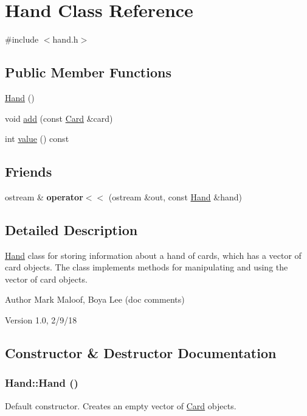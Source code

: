 \hypertarget{classHand}{
\section{Hand Class Reference}
\label{classHand}
}


{\ttfamily \#include $<$hand.h$>$}\subsection*{Public Member Functions}
\begin{DoxyCompactItemize}
\item 
\hyperlink{classHand_aa733faf150351c640fc7d1bf460b07e9}{Hand} ()
\item 
void \hyperlink{classHand_a9c0ca327ec857f46c93c08402d232263}{add} (const \hyperlink{classCard}{Card} \&card)
\item 
int \hyperlink{classHand_ac552f6d63bd6b1bb1d32ebd3d2c25b2e}{value} () const 
\end{DoxyCompactItemize}
\subsection*{Friends}
\begin{DoxyCompactItemize}
\item 
\hypertarget{classHand_a14d9ddfc75ad21d896dcd073479857f6}{
ostream \& {\bfseries operator$<$$<$} (ostream \&out, const \hyperlink{classHand}{Hand} \&hand)}
\label{classHand_a14d9ddfc75ad21d896dcd073479857f6}

\end{DoxyCompactItemize}


\subsection{Detailed Description}
\hyperlink{classHand}{Hand} class for storing information about a hand of cards, which has a vector of card objects. The class implements methods for manipulating and using the vector of card objects.

\begin{DoxyAuthor}{Author}
Mark Maloof, Boya Lee (doc comments) 
\end{DoxyAuthor}
\begin{DoxyVersion}{Version}
1.0, 2/9/18 
\end{DoxyVersion}


\subsection{Constructor \& Destructor Documentation}
\hypertarget{classHand_aa733faf150351c640fc7d1bf460b07e9}{
\subsubsection[{Hand}]{\setlength{\rightskip}{0pt plus 5cm}Hand::Hand ()}}
\label{classHand_aa733faf150351c640fc7d1bf460b07e9}
Default constructor. Creates an empty vector of \hyperlink{classCard}{Card} objects. 

